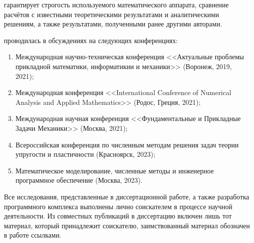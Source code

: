 {\reliability} гарантирует строгость используемого математического аппарата, сравнение расчётов с известными теоретическими результатами и аналитическими решениям, а также результатами, полученными ранее другими авторами.


{\probation}
проводилась в обсуждениях на следующих конференциях:
\begin{enumerate}
	\item Международная научно-техническая конференция <<Актуальные проблемы прикладной математики, информатикии и механики>> (Воронеж, 2019, 2021);
	\item Международная конференция <<International Conference of Numerical Analysis and Applied Mathematics>> (Родос, Греция, 2021);
	\item Международная научная конференция <<Фундаментальные и Прикладные Задачи Механики>> (Москва, 2021);
	\item Всероссийская конференция по численным методам решения задач теории упругости и пластичности (Красноярск, 2023);
	\item Математическое моделирование, численные методы и инженерное программное обеспечение (Москва, 2023).
\end{enumerate}

{\contribution}
Все исследования, представленные в диссертационной работе, а также разработка программного комплекса выполнены лично соискателем в процессе научной деятельности. Из совместных публикаций в диссертацию включен лишь тот материал, который принадлежит соискателю, заимствованный материал обозначен в работе ссылками.

